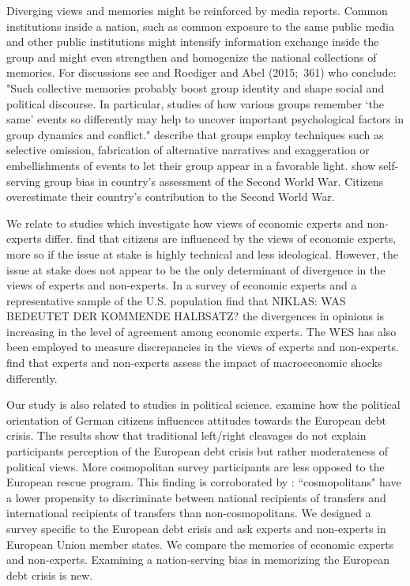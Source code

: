 Diverging views and memories might be reinforced 
by media reports. Common
institutions inside a nation, such as common exposure to the same public
media and other public institutions might intensify information exchange
inside the group
and might even strengthen and homogenize the national collections of
memories. For discussions see \cite{rigney} and Roediger and Abel (2015;\
361) who conclude: "Such collective memories probably boost group identity
and shape social and political discourse. In particular, studies of how
various groups remember `the same' events so differently may help to uncover
important psychological factors in group dynamics and conflict." \cite{baumeister} describe that groups employ techniques such as selective omission, fabrication of alternative narratives and exaggeration or embellishments of events to let their group appear in a favorable light. \cite{abel} show self-serving group bias in country's assessment of the Second World War. Citizens overestimate their country's contribution to the Second World War. 

We relate to studies which investigate how views of economic experts and non-experts differ. \cite{johnston} find that citizens are influenced by the views of economic experts, more so if the issue at stake is highly technical and less ideological. However, the issue at stake does not appear to be the only determinant of divergence in the views of experts and non-experts. In a survey of economic experts and a representative sample of the U.S. population \cite{sapienza} find that NIKLAS: WAS BEDEUTET DER KOMMENDE HALBSATZ? the divergences in opinions is increasing in the level of agreement among economic experts. The WES has also been employed to measure discrepancies in the views of experts and non-experts. \cite{roth} find that experts and non-experts assess the impact of macroeconomic shocks differently.

Our study is also related to studies in political science.
\cite{bechtel} examine how the political orientation of German citizens influences attitudes towards the European debt crisis. The results show that traditional left/right cleavages do not explain participants perception of the European debt crisis but rather moderateness of political views. More cosmopolitan survey participants are less opposed to the European rescue program. This finding is corroborated by \cite{kuhn}: ``cosmopolitans" have a lower propensity to discriminate between national recipients of transfers and international recipients of transfers than non-cosmopolitans. We designed a survey specific to the European debt crisis and ask experts and non-experts in European Union member states. We compare the memories of economic experts and non-experts. Examining a nation-serving bias in memorizing the European debt crisis is new. 


